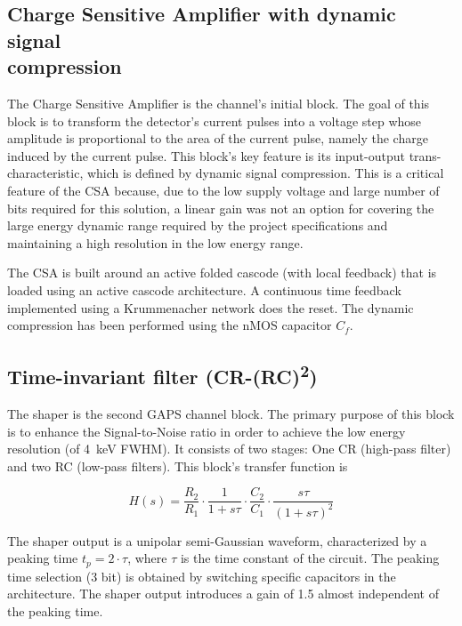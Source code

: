 
\subsection[Charge Sensitive Amplifier with dynamic signal compression]{Charge Sensitive Amplifier with dynamic signal \\compression}
The Charge Sensitive Amplifier is the channel's initial block. The goal of this block is to transform the detector's current pulses into a voltage step whose amplitude is proportional to the area of the current pulse, namely the charge induced by the current pulse. This block's key feature is its input-output trans-characteristic, which is defined by  dynamic signal compression. This is a critical feature of the CSA because, due to the low supply voltage and large number of bits required for this solution, a linear gain was not an option for covering the large energy dynamic range required by the project specifications and maintaining a high resolution in the low energy range.

\par
The CSA is built around an active folded cascode (with local feedback) that is loaded using an active cascode architecture. A continuous time feedback implemented using a Krummenacher network does the reset. The dynamic compression has been performed using the nMOS capacitor $C_f$.


\subsection{Time-invariant filter (CR-(RC)\textsuperscript{2})}
\label{shaper}
The shaper is the second GAPS channel block. The primary purpose of this block is to enhance the Signal-to-Noise ratio in order to achieve the low energy resolution (of \SI{4}{\kilo\electronvolt} FWHM). It consists of two stages: One CR (high-pass filter) and two RC (low-pass filters). This block's transfer function is

\begin{equation}
    H(s) = \frac{R_2}{R_1} \cdot \frac{1}{1+s\tau} \cdot \frac{C_2}{C_1} \cdot \frac{s\tau}{(1+s\tau)^2}
\end{equation}

\noindent
The shaper output is a unipolar semi-Gaussian waveform, characterized by a peaking time $t_p = 2 \cdot \tau$, where $\tau$ is the time constant of the circuit. The peaking time selection (3 bit) is obtained by switching specific capacitors in the architecture. The shaper output introduces a gain of 1.5 almost independent of the peaking time.

